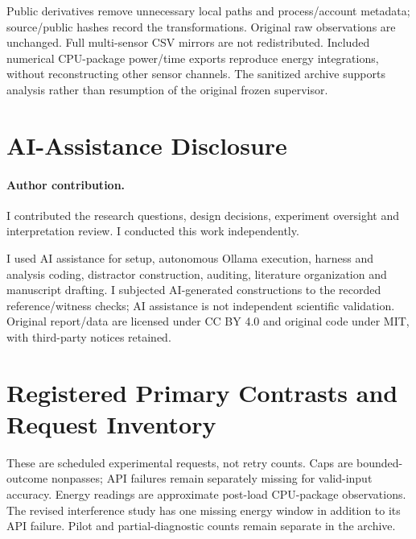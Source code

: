 \documentclass[10pt,a4paper,twocolumn]{article}
\begin{document}
Public derivatives remove unnecessary local paths and process/account metadata;
source/public hashes record the transformations. Original raw observations are
unchanged. Full multi-sensor CSV mirrors are not redistributed. Included numerical
CPU-package power/time exports reproduce energy integrations, without reconstructing
other sensor channels. The sanitized archive supports analysis rather than
resumption of the original frozen supervisor.
\par\endgroup

\section{AI-Assistance Disclosure}
\paragraph{Author contribution.}
I contributed the research questions, design decisions, experiment oversight
and interpretation review. I conducted this work independently.

I used AI assistance for setup, autonomous Ollama execution,
harness and analysis coding, distractor construction, auditing, literature
organization and manuscript drafting. I subjected AI-generated constructions
to the recorded reference/witness checks; AI assistance is not independent
scientific validation. Original report/data are licensed under CC BY 4.0 and original code
under MIT, with third-party notices retained.
\label{maintext:end}

\begingroup
\footnotesize
\setlength{\bibsep}{3pt}


\endgroup
\onecolumn
\appendix
\section{Registered Primary Contrasts and Request Inventory}
\begin{center}\small\end{center}
These are scheduled experimental requests, not retry counts. Caps are bounded-outcome
nonpasses; API failures remain separately missing for valid-input accuracy.
Energy readings are approximate post-load CPU-package observations. The revised
interference study has one missing energy window in addition to its API failure.
Pilot and partial-diagnostic counts remain separate in the archive.
\end{document}
